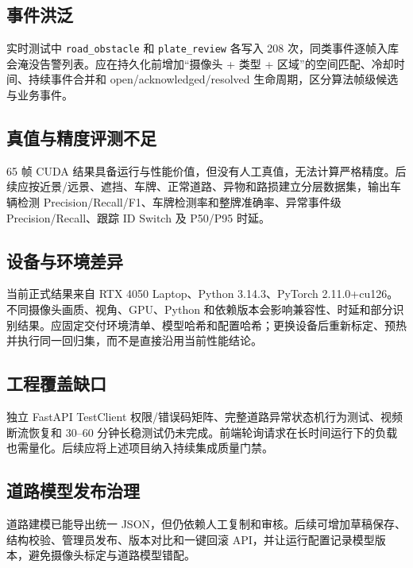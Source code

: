 \subsection{事件洪泛}\label{summary-ux4e8bux4ef6ux6d2aux6cdb}

实时测试中 \texttt{road\_\allowbreak{}obstacle} 和 \texttt{plate\_\allowbreak{}review} 各写入 208 次，同类事件逐帧入库会淹没告警列表。应在持久化前增加``摄像头 + 类型 + 区域''的空间匹配、冷却时间、持续事件合并和 open/acknowledged/resolved 生命周期，区分算法帧级候选与业务事件。

\subsection{真值与精度评测不足}\label{summary-ux771fux503cux4e0eux7cbeux5ea6ux8bc4ux6d4bux4e0dux8db3}

65 帧 CUDA 结果具备运行与性能价值，但没有人工真值，无法计算严格精度。后续应按近景/远景、遮挡、车牌、正常道路、异物和路损建立分层数据集，输出车辆检测 Precision/Recall/F1、车牌检测率和整牌准确率、异常事件级 Precision/Recall、跟踪 ID Switch 及 P50/P95 时延。

\subsection{设备与环境差异}\label{summary-ux8bbeux5907ux4e0eux73afux5883ux5deeux5f02}

当前正式结果来自 RTX 4050 Laptop、Python 3.14.3、PyTorch 2.11.0+cu126。不同摄像头画质、视角、GPU、Python 和依赖版本会影响兼容性、时延和部分识别结果。应固定交付环境清单、模型哈希和配置哈希；更换设备后重新标定、预热并执行同一回归集，而不是直接沿用当前性能结论。

\subsection{工程覆盖缺口}\label{summary-ux5de5ux7a0bux8986ux76d6ux7f3aux53e3}

独立 FastAPI TestClient 权限/错误码矩阵、完整道路异常状态机行为测试、视频断流恢复和 30--60 分钟长稳测试仍未完成。前端轮询请求在长时间运行下的负载也需量化。后续应将上述项目纳入持续集成质量门禁。

\subsection{道路模型发布治理}\label{summary-ux9053ux8defux6a21ux578bux53d1ux5e03ux6cbbux7406}

道路建模已能导出统一 JSON，但仍依赖人工复制和审核。后续可增加草稿保存、结构校验、管理员发布、版本对比和一键回滚 API，并让运行配置记录模型版本，避免摄像头标定与道路模型错配。

